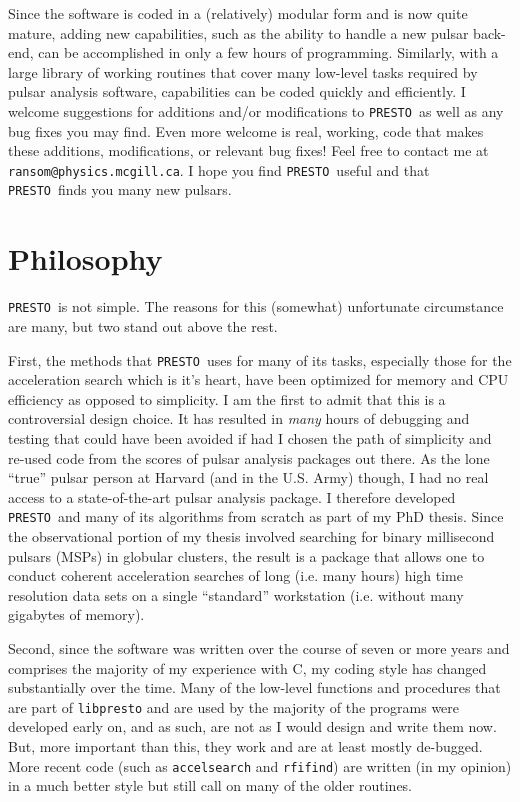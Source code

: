 \documentclass[11pt]{article}
\newcommand{\PRESTO}{{\tt PRESTO}}
\begin{document}
Since the software is coded in a (relatively) modular form and is now
quite mature, adding new capabilities, such as the ability to handle a
new pulsar back-end, can be accomplished in only a few hours of
programming.  Similarly, with a large library of working routines that
cover many low-level tasks required by pulsar analysis software,
capabilities can be coded quickly and efficiently.  I welcome
suggestions for additions and/or modifications to \PRESTO\ as well as
any bug fixes you may find.  Even more welcome is real, working, code
that makes these additions, modifications, or relevant bug fixes!
Feel free to contact me at {\tt ransom@physics.mcgill.ca}.  I hope you
find \PRESTO\ useful and that \PRESTO\ finds you many new pulsars.


\section{Philosophy}

\PRESTO\ is not simple.  The reasons for this (somewhat) unfortunate
circumstance are many, but two stand out above the rest.

First, the methods that \PRESTO\ uses for many of its tasks,
especially those for the acceleration search which is it's heart, have
been optimized for memory and CPU efficiency as opposed to simplicity.
I am the first to admit that this is a controversial design choice.
It has resulted in \emph{many} hours of debugging and testing that
could have been avoided if had I chosen the path of simplicity and
re-used code from the scores of pulsar analysis packages out there.
As the lone ``true'' pulsar person at Harvard (and in the U.S.  Army)
though, I had no real access to a state-of-the-art pulsar analysis
package.  I therefore developed \PRESTO\ and many of its algorithms
from scratch as part of my PhD thesis.  Since the observational
portion of my thesis involved searching for binary millisecond pulsars
(MSPs) in globular clusters, the result is a package that allows one
to conduct coherent acceleration searches of long (i.e. many hours)
high time resolution data sets on a single ``standard'' workstation
(i.e. without many gigabytes of memory).

Second, since the software was written over the course of seven or
more years and comprises the majority of my experience with C, my
coding style has changed substantially over the time.  Many of the
low-level functions and procedures that are part of {\tt libpresto}
and are used by the majority of the programs were developed early on,
and as such, are not as I would design and write them now.  But, more
important than this, they work and are at least mostly de-bugged.
More recent code (such as {\tt accelsearch} and {\tt rfifind}) are
written (in my opinion) in a much better style but still call on many
of the older routines.
\end{document}
